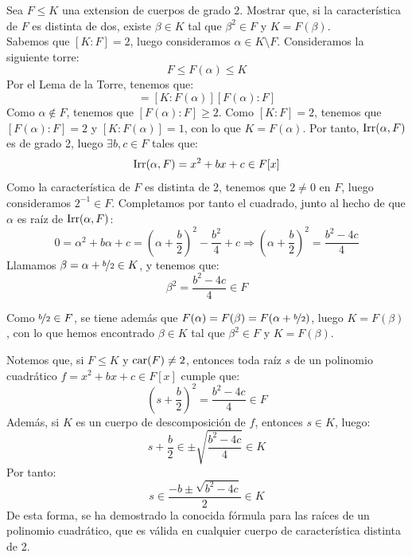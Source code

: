 \begin{ejercicio}
    Sea $F \leq K$ una extension de cuerpos de grado $2$. Mostrar que, si la característica de $F$ es distinta de dos, existe $\beta \in K$ tal que $\beta^2 \in F$ y $K = F(\beta)$.\\

    Sabemos que $[K:F] = 2$, luego consideramos $\alpha \in K\setminus F$. Consideramos la siguiente torre:
    \begin{equation*}
        F \leq F(\alpha) \leq K
    \end{equation*}
    Por el Lema de la Torre, tenemos que:
    \begin{equation*}
        [K:F] = [K:F(\alpha)][F(\alpha):F]
    \end{equation*}
    Como $\alpha\notin F$, tenemos que $[F(\alpha):F] \geq 2$. Como $[K:F] = 2$, tenemos que $[F(\alpha):F] = 2$ y $[K:F(\alpha)] = 1$, con lo que $K = F(\alpha)$. Por tanto, $\operatorname{Irr}(\alpha,F)$ es de grado 2, luego $\exists b,c\in F$ tales que:
    \begin{equation*}
        \operatorname{Irr}(\alpha,F) = x^2 + bx + c\in F[x]
    \end{equation*}
    Como la característica de $F$ es distinta de 2, tenemos que $2\neq 0$ en $F$, luego consideramos $2^{-1}\in F$. Completamos por tanto el cuadrado, junto al hecho de que $\alpha$ es raíz de $\operatorname{Irr}(\alpha,F)$:
    \begin{equation*}
        0 = \alpha^2 + b\alpha + c = \left(\alpha+\dfrac{b}{2}\right)^2 - \dfrac{b^2}{4} + c
        \Longrightarrow \left(\alpha+\dfrac{b}{2}\right)^2 = \dfrac{b^2-4c}{4}
    \end{equation*}
    Llamamos $\beta = \alpha + \nicefrac{b}{2}\in K$, y tenemos que:
    \begin{equation*}
        \beta^2 = \dfrac{b^2-4c}{4} \in F
    \end{equation*}

    Como $\nicefrac{b}{2}\in F$, se tiene además que $F(\alpha)=F(\beta)=F(\alpha+\nicefrac{b}{2})$, luego $K = F(\beta)$, con lo que hemos encontrado $\beta\in K$ tal que $\beta^2\in F$ y $K = F(\beta)$.
\end{ejercicio}
\begin{observacion}
    Notemos que, si $F\leq K$ y $\operatorname{car}(F)\neq 2$, entonces toda raíz $s$ de un polinomio cuadrático $f=x^2+bx+c\in F[x]$ cumple que:
    \begin{equation*}
        \left(s+\frac{b}{2}\right)^2 = \frac{b^2-4c}{4} \in F
    \end{equation*}
    Además, si $K$ es un cuerpo de descomposición de $f$, entonces $s\in K$, luego:
    \begin{equation*}
        s+\frac{b}{2}\in \pm \sqrt{\frac{b^2-4c}{4}} \in K
    \end{equation*}
    Por tanto:
    \begin{equation*}
        s \in \dfrac{-b\pm \sqrt{b^2-4c}}{2} \in K
    \end{equation*}
    De esta forma, se ha demostrado la conocida fórmula para las raíces de un polinomio cuadrático, que es válida en cualquier cuerpo de característica distinta de 2.
\end{observacion}

